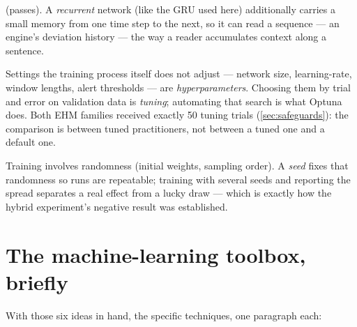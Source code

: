 \begin{description}
    (passes). A \emph{recurrent} network (like the GRU used here) additionally carries a
    small memory from one time step to the next, so it can read a sequence --- an engine's
    deviation history --- the way a reader accumulates context along a sentence.
  \item[Hyperparameters and tuning.] Settings the training process itself does not adjust
    --- network size, learning-rate, window lengths, alert thresholds --- are
    \emph{hyperparameters}. Choosing them by trial and error on validation data is
    \emph{tuning}; automating that search is what Optuna does. Both EHM families received
    exactly 50 tuning trials (\cref{sec:safeguards}): the comparison is between tuned
    practitioners, not between a tuned one and a default one.
  \item[Seeds and variance.] Training involves randomness (initial weights, sampling
    order). A \emph{seed} fixes that randomness so runs are repeatable; training with
    several seeds and reporting the spread separates a real effect from a lucky draw ---
    which is exactly how the hybrid experiment's negative result was established.
\end{description}

\section{The machine-learning toolbox, briefly}
\label{sec:ai-toolbox}

With those six ideas in hand, the specific techniques, one paragraph each:

